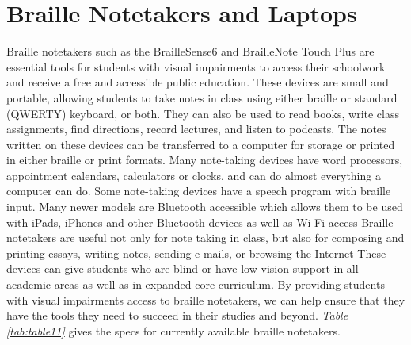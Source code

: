 \pagebreak
\hypertarget{braille-notetakers-and-braille-laptop-computers}{}\section{Braille Notetakers and Laptops}\label{braille-notetakers-and-braille-laptop-computers}

Braille notetakers such as the BrailleSense6 and BrailleNote Touch Plus are essential tools for students with visual impairments to access their schoolwork and receive a free and accessible public education. These devices are small and portable, allowing students to take notes in class using either braille or standard (QWERTY) keyboard, or both. They can also be used to read books, write class assignments, find directions, record lectures, and listen to podcasts. The notes written on these devices can be transferred to a computer for storage or printed in either braille or print formats. Many note-taking devices have word processors, appointment calendars, calculators or clocks, and can do almost everything a computer can do. Some note-taking devices have a speech program with braille input. Many newer models are Bluetooth accessible which allows them to be used with iPads, iPhones and other Bluetooth devices as well as Wi-Fi access Braille notetakers are useful not only for note taking in class, but also for composing and printing essays, writing notes, sending e-mails, or browsing the Internet These devices can give students who are blind or have low vision support in all academic areas as well as in expanded core curriculum. By providing students with visual impairments access to braille notetakers, we can help ensure that they have the tools they need to succeed in their studies and beyond. \textit{Table \ref{tab:table11}} gives the specs for currently available braille notetakers.

